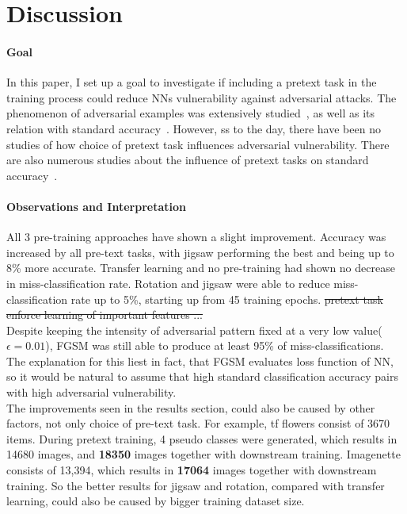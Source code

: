 \section{Discussion}

\paragraph{Goal}In this paper, I set up a goal to investigate if including a pretext task in the training process could reduce NNs
vulnerability against adversarial attacks.
The phenomenon of adversarial examples was extensively studied~\cite{ilyas2019adversarial, DBLP:journals/corr/abs-1802-08195, goodfellow2015explaining},
as well as its relation with standard accuracy~\cite{https://doi.org/10.48550/arxiv.1805.12152}.
However, ss to the day, there have been no studies of how choice of pretext task influences adversarial vulnerability.
There are also numerous studies about the influence of pretext tasks on standard
accuracy~\cite{DBLP:journals/corr/abs-1912-01991, DBLP:journals/corr/NorooziF16, kolesnikov2019revisiting}.


\paragraph{Observations and Interpretation}
All 3 pre-training approaches have shown a slight improvement.
Accuracy was increased by all pre-text tasks, with jigsaw performing the best and being up to 8\% more accurate.
Transfer learning and no pre-training had shown no decrease in miss-classification rate.
Rotation and jigsaw were able to reduce miss-classification rate up to 5\%, starting up from 45 training epochs.
\st{pretext task enforce learning of important features ...}
\\
Despite keeping the intensity of adversarial pattern fixed at a very low value($\epsilon = 0.01$),
FGSM was still able to produce at least 95\% of miss-classifications.
The explanation for this liest in fact, that FGSM evaluates loss function of NN,
so it would be natural to assume that high standard classification accuracy pairs with high adversarial vulnerability.
\\
The improvements seen in the results section, could also be caused by other factors, not only choice of pre-text task.
For example, tf flowers consist of 3670 items.
During pretext training, 4 pseudo classes were generated,
which results in 14680 images, and \textbf{18350} images together with downstream training.
Imagenette consists of 13,394, which results in \textbf{17064} images together with downstream training.
So the better results for jigsaw and rotation, compared with transfer learning,
could also be caused by bigger training dataset size.

